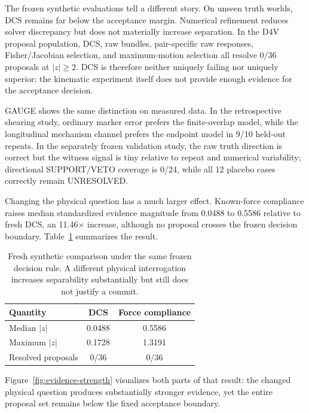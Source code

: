 \documentclass[acmtog]{acmart}
\begin{document}
The frozen synthetic evaluations tell a different story. On unseen truth worlds, DCS remains far below the acceptance margin. Numerical refinement reduces solver discrepancy but does not materially increase separation. In the D4V proposal population, DCS, raw bundles, pair-specific raw responses, Fisher/Jacobian selection, and maximum-motion selection all resolve 0/36 proposals at \(|z|\ge2\). DCS is therefore neither uniquely failing nor uniquely superior: the kinematic experiment itself does not provide enough evidence for the acceptance decision.

GAUGE shows the same distinction on measured data. In the retrospective shearing study, ordinary marker error prefers the finite-overlap model, while the longitudinal mechanism channel prefers the endpoint model in 9/10 held-out repeats. In the separately frozen validation study, the raw truth direction is correct but the witness signal is tiny relative to repeat and numerical variability; directional SUPPORT/VETO coverage is 0/24, while all 12 placebo cases correctly remain UNRESOLVED.

Changing the physical question has a much larger effect. Known-force compliance raises median standardized evidence magnitude from 0.0488 to 0.5586 relative to fresh DCS, an 11.46\(\times\) increase, although no proposal crosses the frozen decision boundary. Table~\ref{tab:ofc} summarizes the result.

\begin{table}[t]
\centering
\caption{Fresh synthetic comparison under the same frozen decision rule. A different physical interrogation increases separability substantially but still does not justify a commit.}
\label{tab:ofc}
\begin{tabular}{lcc}
\toprule
Quantity & DCS & Force compliance \\
\midrule
Median \(|z|\) & 0.0488 & 0.5586 \\
Maximum \(|z|\) & 0.1728 & 1.3191 \\
Resolved proposals & 0/36 & 0/36 \\
\bottomrule
\end{tabular}
\end{table}

Figure~\ref{fig:evidence-strength} visualizes both parts of that result: the changed physical question produces substantially stronger evidence, yet the entire proposal set remains below the fixed acceptance boundary.
\end{document}
